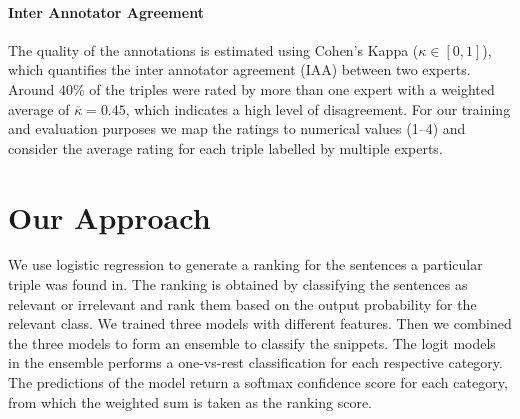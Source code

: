 {\setlength{\parindent}{0cm}
\paragraph{\textbf{Inter Annotator Agreement}}
The quality of the annotations is estimated using Cohen's Kappa ($\kappa\in [0,1]$), which quantifies the inter annotator agreement (IAA) between two experts.%
Around 40\% of the triples were rated by more than one expert with a weighted average of $\overline{\kappa}=0.45$, which indicates a high level of disagreement.
For our training and evaluation purposes we map the ratings to numerical values (1--4) and consider the average rating for each triple labelled by multiple experts.
}


\section{Our Approach}
We use logistic regression to generate a ranking for the sentences a particular triple was found in.
The ranking is obtained by classifying the sentences as relevant or irrelevant and rank them based on the output probability for the relevant class.
We trained three models with different features.
Then we combined the three models to form an ensemble to classify the snippets.
The logit models in the ensemble performs a one-vs-rest classification for each respective category.
The predictions of the model return a softmax confidence score for each category, from which the weighted sum is taken as the ranking score.


